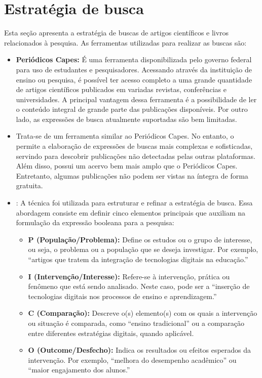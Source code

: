 \section{Estratégia de busca}
Esta seção apresenta a estratégia de buscas de artigos científicos e livros relacionados à pesquisa. As ferramentas utilizadas para realizar as buscas são:
\begin{itemize}
    \item \textbf{Periódicos Capes:} É uma ferramenta disponibilizada pelo governo federal para uso de estudantes e pesquisadores. Acessando através da instituição de ensino ou pesquisa, é possível ter acesso completo a uma grande quantidade de artigos científicos publicados em variadas revistas, conferências e universidades. A principal vantagem dessa ferramenta é a possibilidade de ler o conteúdo integral de grande parte das publicações disponíveis. Por outro lado, as expressões de busca atualmente suportadas são bem limitadas.
    \item \textbf{} Trata-se de um ferramenta similar ao Periódicos Capes. No entanto, o  permite a elaboração de expressões de buscas mais complexas e sofisticadas, servindo para descobrir publicações não detectadas pelas outras plataformas. Além disso, possui um acervo bem mais amplo que o Periódicos Capes. Entretanto, algumas publicações não podem ser vistas na íntegra de forma gratuita.
    \item \textbf{}: A técnica  foi utilizada para estruturar e refinar a estratégia de busca. Essa abordagem consiste em definir cinco elementos principais que auxiliam na formulação da expressão booleana para a pesquisa:
\begin{itemize}
    \item \textbf{P (População/Problema):} Define os estudos ou o grupo de interesse, ou seja, o problema ou a população que se deseja investigar. Por exemplo, “artigos que tratem da integração de tecnologias digitais na educação.”
    \item \textbf{I (Intervenção/Interesse):} Refere-se à intervenção, prática ou fenômeno que está sendo analisado. Neste caso, pode ser a “inserção de tecnologias digitais nos processos de ensino e aprendizagem.”
    \item \textbf{C (Comparação):} Descreve o(s) elemento(s) com os quais a intervenção ou situação é comparada, como “ensino tradicional” ou a comparação entre diferentes estratégias digitais, quando aplicável.
    \item \textbf{O (Outcome/Desfecho):} Indica os resultados ou efeitos esperados da intervenção. Por exemplo, “melhora do desempenho acadêmico” ou “maior engajamento dos alunos.”

\end{itemize}
\end{itemize}
